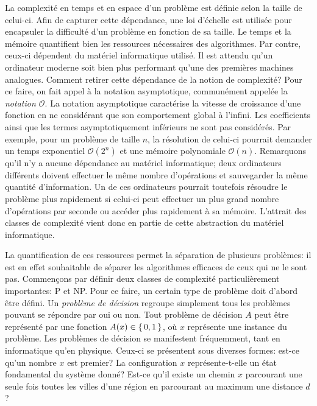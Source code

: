 La complexité en temps et en espace d'un problème est définie selon la taille de celui-ci. Afin de capturer cette dépendance, une loi d'échelle est utilisée pour encapsuler la difficulté d'un problème en fonction de sa taille. Le temps et la mémoire quantifient bien les ressources nécessaires des algorithmes. Par contre, ceux-ci dépendent du matériel informatique utilisé. Il est attendu qu'un ordinateur moderne soit bien plus performant qu'une des premières machines analogues. Comment retirer cette dépendance de la notion de complexité? Pour ce faire, on fait appel à la notation asymptotique, communément appelée la \textit{notation $\mathcal{O}$}. La notation asymptotique caractérise la vitesse de croissance d'une fonction en ne considérant que son comportement global à l'infini. Les coefficients ainsi que les termes asymptotiquement inférieurs ne sont pas considérés. Par exemple, pour un problème de taille $n$, la résolution de celui-ci pourrait demander un temps exponentiel $\mathcal{O}(2^{n})$ et une mémoire polynomiale $\mathcal{O}(n)$. Remarquons qu'il n'y a aucune dépendance au matériel informatique; deux ordinateurs différents doivent effectuer le même nombre d'opérations et sauvegarder la même quantité d'information. Un de ces ordinateurs pourrait toutefois résoudre le problème plus rapidement si celui-ci peut effectuer un plus grand nombre d'opérations par seconde ou accéder plus rapidement à sa mémoire. L'attrait des classes de complexité vient donc en partie de cette abstraction du matériel informatique.

La quantification de ces ressources permet la séparation de plusieurs problèmes: il est en effet souhaitable de séparer les algorithmes efficaces de ceux qui ne le sont pas. Commençons par définir deux classes de complexité particulièrement importantes: \textsf{P} et \textsf{NP}. Pour ce faire, un certain type de problème doit d'abord être défini. Un \textit{problème de décision} regroupe simplement tous les problèmes pouvant se répondre par oui ou non. Tout problème de décision $A$ peut être représenté par une fonction $A(x) \in \set{ 0, 1 }$, où $x$ représente une instance du problème. Les problèmes de décision se manifestent fréquemment, tant en informatique qu'en physique. Ceux-ci se présentent sous diverses formes: est-ce qu'un nombre $x$ est premier? La configuration $x$ représente-t-elle un état fondamental du système donné? Est-ce qu'il existe un chemin $x$ parcourant une seule fois toutes les villes d'une région en parcourant au maximum une distance $d$?

